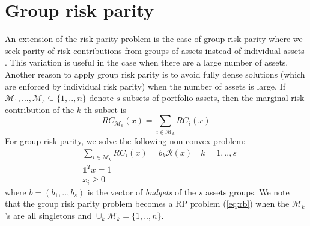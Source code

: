 \section{Group risk parity}
An extension of the risk parity problem is the case of group risk parity where we seek parity of risk contributions from groups of assets instead of individual assets \cite{tutuncu}. This variation
is useful in the case when there are a large number of assets. Another reason to apply group risk parity is to avoid fully dense solutions (which are enforced by individual risk parity) when the number of assets is large. If $\mathcal{M}_1, ..., \mathcal{M}_s \subseteq \{1,..,n\}$ denote $s$ subsets of portfolio assets, then the marginal risk contribution of the $k$-th subset is
\begin{equation}
RC_{\mathcal{M}_k}(x) = \sum_{i \in \mathcal{M}_k} RC_i(x)
\end{equation} For group risk parity, we solve the following non-convex problem:
\begin{equation}
\begin{aligned}
&\sum_{i \in \mathcal{M}_k} RC_i(x) = b_k \mathcal{R}(x) \quad k=1,..,s\\
&\mathds{1}^T x = 1\\
& x_i \geq 0
\end{aligned}
\end{equation}
where $b=(b_1,..,b_s)$ is the vector of \textit{budgets} of the $s$ assets groups. We note that the group risk parity problem becomes a RP problem (\ref{eq:rb}) when the $\mathcal{M}_k$'s are all singletons and $\cup_k \mathcal{M}_k = \{1,..,n\}$.
